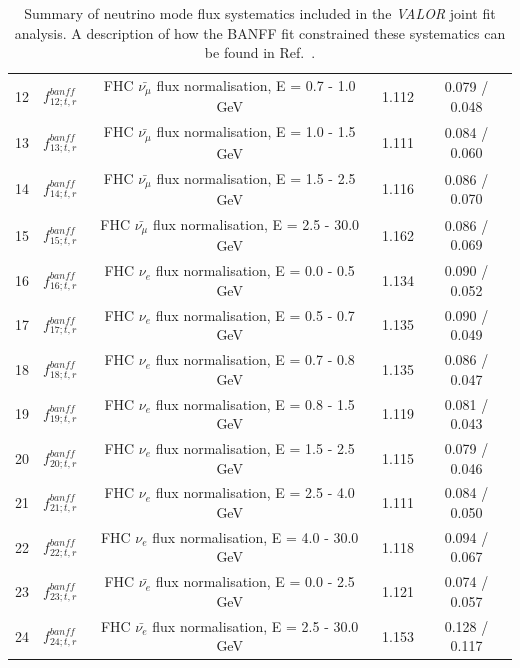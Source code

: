 {\begin{table}
\begin{tabular}{| c | c | c | c | c |}
12     &$f_{12; t, r}^{banff}$ & FHC $\bar{\nu_\mu}$ flux normalisation, E = 0.7 - 1.0 GeV   & 1.112   & 0.079 / 0.048 \\  
13     &$f_{13; t, r}^{banff}$ & FHC $\bar{\nu_\mu}$ flux normalisation, E = 1.0 - 1.5 GeV   & 1.111   & 0.084 / 0.060 \\  
14     &$f_{14; t, r}^{banff}$ & FHC $\bar{\nu_\mu}$ flux normalisation, E = 1.5 - 2.5 GeV   & 1.116   & 0.086 / 0.070 \\  
15     &$f_{15; t, r}^{banff}$ & FHC $\bar{\nu_\mu}$ flux normalisation, E = 2.5 - 30.0 GeV  & 1.162   & 0.086 / 0.069 \\  
16     &$f_{16; t, r}^{banff}$ & FHC $\nu_e$ flux normalisation, E = 0.0 - 0.5 GeV           & 1.134   & 0.090 / 0.052 \\  
17     &$f_{17; t, r}^{banff}$ & FHC $\nu_e$ flux normalisation, E = 0.5 - 0.7 GeV           & 1.135   & 0.090 / 0.049 \\  
18     &$f_{18; t, r}^{banff}$ & FHC $\nu_e$ flux normalisation, E = 0.7 - 0.8 GeV           & 1.135   & 0.086 / 0.047 \\  
19     &$f_{19; t, r}^{banff}$ & FHC $\nu_e$ flux normalisation, E = 0.8 - 1.5 GeV           & 1.119   & 0.081 / 0.043 \\  
20     &$f_{20; t, r}^{banff}$ & FHC $\nu_e$ flux normalisation, E = 1.5 - 2.5 GeV           & 1.115   & 0.079 / 0.046 \\  
21     &$f_{21; t, r}^{banff}$ & FHC $\nu_e$ flux normalisation, E = 2.5 - 4.0 GeV           & 1.111   & 0.084 / 0.050 \\  
22     &$f_{22; t, r}^{banff}$ & FHC $\nu_e$ flux normalisation, E = 4.0 - 30.0 GeV          & 1.118   & 0.094 / 0.067 \\  
23     &$f_{23; t, r}^{banff}$ & FHC $\bar{\nu_e}$ flux normalisation, E = 0.0 - 2.5 GeV     & 1.121   & 0.074 / 0.057 \\  
24     &$f_{24; t, r}^{banff}$ & FHC $\bar{\nu_e}$ flux normalisation, E = 2.5 - 30.0 GeV    & 1.153   & 0.128 / 0.117 \\  

\hline

\end{tabular}

\caption{
Summary of neutrino mode flux systematics included in the {\em VALOR} joint fit analysis.
A description of how the BANFF fit constrained these systematics can be found in Ref.~\cite{BANFF2015}.
}
\label{tab:banff_uncertainties_flux_fhc}


\end{table}}
